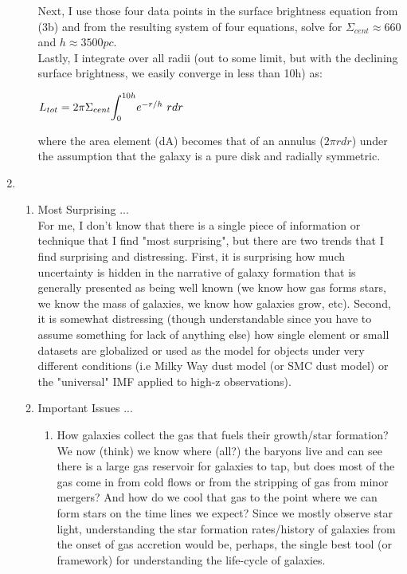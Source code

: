 \documentclass[11pt]{article}
\begin{document}
\begin{enumerate}
\begin{enumerate}
	Next, I use those four data points in the surface brightness equation from (3b) and from the resulting system of four equations, solve for $\Sigma_{cent} \approx 660$ and $h \approx 3500pc$.\\
	
	Lastly, I integrate over all radii (out to some limit, but with the declining surface brightness, we easily converge in less than 10h) as:
	
	\hspace{10mm} $L_{tot} = 2\pi \Sigma_{cent} \mathlarger{\int_{0}^{10h}} e^{-r/h}\ r dr$ 
	

	where the area element (dA) becomes that of an annulus ($2\pi rdr$) under the assumption that the galaxy is a pure disk and radially symmetric.\\  
	     
  
  \end{enumerate}
  
  \item 
  
  \begin{enumerate}
  
  \item Most Surprising ...\\
  
  For me, I don't know that there is a single piece of information or technique that I find "most surprising", but there are two trends that I find surprising and distressing. First, it is surprising how much uncertainty is hidden in the narrative of galaxy formation that is generally presented as being well known (we know how gas forms stars, we know the mass of galaxies, we know how galaxies grow, etc). Second, it is somewhat distressing (though understandable since you have to assume something for lack of anything else) how single element or small datasets are globalized or used as the model for objects under very different conditions (i.e Milky Way dust model (or SMC dust model) or the "universal" IMF applied to high-z observations).\\
  
  
  \item Important Issues ...
	  \begin{enumerate}
	  \item How galaxies collect the gas that fuels their growth/star formation? We now (think) we know where (all?) the baryons live and can see there is a large gas reservoir for galaxies to tap, but does most of the gas come in from cold flows or from the stripping of gas from minor mergers? And how do we cool that gas to the point where we can form stars on the time lines we expect? Since we mostly observe star light, understanding the star formation rates/history of galaxies from the onset of gas accretion would be, perhaps, the single best tool (or framework) for understanding the life-cycle of galaxies.\\
	  

\end{enumerate}
\end{enumerate}
\end{enumerate}
\end{document}

